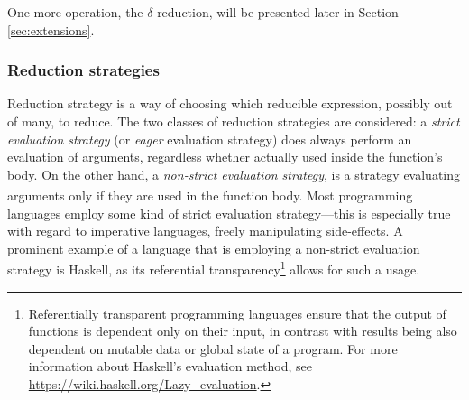 \documentclass[table, a4paper, 10pt]{article}
\newcommand{\cit}[1]{\textsuperscript{\cite{#1}}}
\begin{document}
\begin{prooftree}
\end{prooftree}

\noindent
One more operation, the $\delta$-reduction, will be presented later in Section \ref{sec:extensions}.

\subsubsection{Reduction strategies}
Reduction strategy is a way of choosing which reducible expression, possibly out of many,
to reduce. The two classes of reduction strategies are considered:
a \textit{strict evaluation strategy} (or \textit{eager} evaluation strategy) does always perform an evaluation of arguments, regardless whether actually
used inside the function's body. On the other hand, a \textit{non-strict evaluation strategy},
is a strategy
evaluating arguments only if they are used in the function body.\cit{pierce} Most programming languages employ
some kind of strict evaluation strategy---this is especially true with regard to imperative languages,
freely manipulating side-effects. A prominent example of a language that is employing a non-strict
evaluation strategy is Haskell, as its referential transparency\footnote{Referentially transparent programming languages
ensure that the output of functions is dependent only on their input, in contrast with
results being also dependent on mutable data or global state of a program.
For more information about Haskell's evaluation method, see \url{https://wiki.haskell.org/Lazy_evaluation}.} allows for such a usage.
\end{document}

